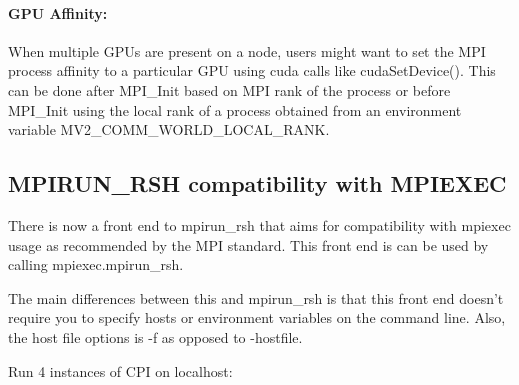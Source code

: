 \paragraph{GPU Affinity:}

When multiple GPUs are present on a node, users might want to set the
MPI process affinity to a particular GPU using cuda calls like cudaSetDevice().
This can be done after MPI\_Init based on MPI rank of the process or before
MPI\_Init using the local rank of a process obtained from an environment variable
MV2\_COMM\_WORLD\_LOCAL\_RANK.


\subsection{MPIRUN\_RSH compatibility with MPIEXEC}
There is now a front end to mpirun\_rsh that aims for compatibility with mpiexec
usage as recommended by the MPI standard.  This front end is can be used by
calling mpiexec.mpirun\_rsh.

The main differences between this and mpirun\_rsh is that this front end
doesn't require you to specify hosts or environment variables on the command
line.  Also, the host file options is -f as opposed to -hostfile.

\noindent Run 4 instances of CPI on localhost:

